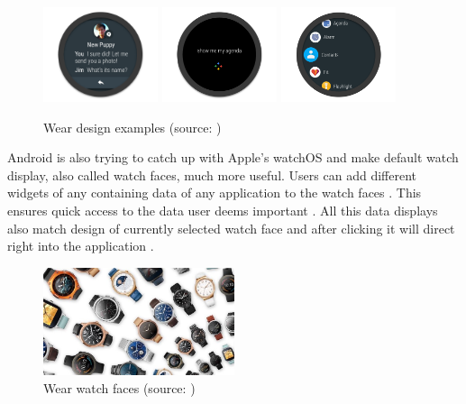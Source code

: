 \begin{figure}[H]
	\begin{centering}
		\includegraphics[width=0.3\textwidth]{img/wear_design_notification}
		\includegraphics[width=0.3\textwidth]{img/wear_design_agenda}
		\includegraphics[width=0.3\textwidth]{img/wear_design_menu}
		\par\end{centering}
	\caption{Wear design examples (source: \cite{DoAW})\label{fig:WearDesignExamples}}
	\label{fig8}
\end{figure}

Android is also trying to catch up with Apple's watchOS and make default watch display, also called watch faces, much more useful. Users can add different widgets of any containing data of any application to the watch faces \cite{AW2UG}. This ensures quick access to the data user deems important \cite{AW2N}. All this data displays also match design of currently selected watch face and after clicking it will direct right into the application \cite{AW2WN}.

\begin{figure}[H]
	\begin{centering}
		\includegraphics[width=0.5\textwidth]{img/wear_watch_faces}
		\par\end{centering}
	\caption{Wear watch faces (source: \cite{AW2UG})\label{fig:WearWatchFaces}}
	\label{fig9}
\end{figure}

